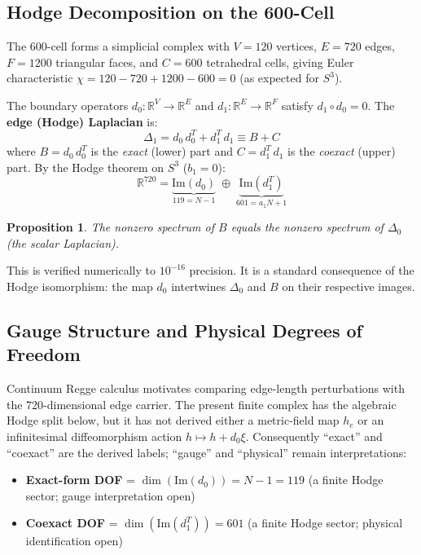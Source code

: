 \documentclass[12pt,a4paper]{article}
\newtheorem{proposition}{Proposition}
\theoremstyle{definition}
\begin{document}
\subsection{Hodge Decomposition on the 600-Cell}

The 600-cell forms a simplicial complex with $V = 120$ vertices, $E = 720$ edges, $F = 1200$ triangular faces, and $C = 600$ tetrahedral cells, giving Euler characteristic $\chi = 120 - 720 + 1200 - 600 = 0$ (as expected for $S^3$).

The boundary operators $d_0: \mathbb{R}^V \to \mathbb{R}^E$ and $d_1: \mathbb{R}^E \to \mathbb{R}^F$ satisfy $d_1 \circ d_0 = 0$. The \textbf{edge (Hodge) Laplacian} is:
\begin{equation}
\Delta_1 = d_0\,d_0^T + d_1^T\,d_1 \equiv B + C
\end{equation}
where $B = d_0\,d_0^T$ is the \emph{exact} (lower) part and $C = d_1^T\,d_1$ is the \emph{coexact} (upper) part. By the Hodge theorem on $S^3$ ($b_1 = 0$):
\begin{equation}
\mathbb{R}^{720} = \underbrace{\mathrm{Im}(d_0)}_{119 = N-1} \;\oplus\; \underbrace{\mathrm{Im}(d_1^T)}_{601 = a_1 N + 1}
\end{equation}

\begin{proposition}
The nonzero spectrum of $B$ equals the nonzero spectrum of $\Delta_0$ (the scalar Laplacian).
\end{proposition}

This is verified numerically to $10^{-16}$ precision. It is a standard consequence of the Hodge isomorphism: the map $d_0$ intertwines $\Delta_0$ and $B$ on their respective images.

\subsection{Gauge Structure and Physical Degrees of Freedom}

Continuum Regge calculus motivates comparing edge-length perturbations with the 720-dimensional edge carrier.  The present finite complex has the algebraic Hodge split below, but it has not derived either a metric-field map $h_e$ or an infinitesimal diffeomorphism action $h\mapsto h+d_0\xi$.  Consequently ``exact'' and ``coexact'' are the derived labels; ``gauge'' and ``physical'' remain interpretations:
\begin{itemize}
\item \textbf{Exact-form DOF} = $\dim(\mathrm{Im}(d_0)) = N - 1 = 119$ (a finite Hodge sector; gauge interpretation open)
\item \textbf{Coexact DOF} = $\dim(\mathrm{Im}(d_1^T)) = 601$ (a finite Hodge sector; physical identification open)
\end{itemize}
\end{document}
